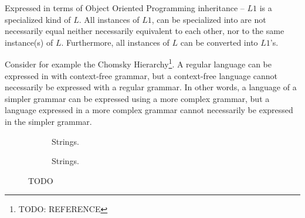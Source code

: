 \documentclass{scrreprt}
\begin{document}
Expressed in terms of Object Oriented Programming inheritance -- $L1$ is a specialized kind of $L$. All instances of $L1$, can be specialized into are not necessarily equal  neither necessarily equivalent to each other, nor to the same instance(s) of $L$. Furthermore, all instances of $L$ can be converted into $L1$'s.

Consider for example the Chomsky Hierarchy\footnote{TODO: REFERENCE}. A regular language can be expressed in with context-free grammar, but a context-free language cannot necessarily be expressed with a regular grammar. In other words, a language of a simpler grammar can be expressed using a more complex grammar, but a language expressed in a more complex grammar cannot necessarily be expressed in the simpler grammar.


\begin{figure}[h]
\centering

  \begin{subfigure}{.5\textwidth}
    \centering


    \caption{Strings.}
    \label{fig:concrete-specialization-tree-example-run}

  \end{subfigure}%
  \begin{subfigure}{.5\textwidth}

    \centering


    \caption{Strings.}
    \label{fig:concrete-specialization-tree-example-run}
  \end{subfigure}


  \caption{TODO}
  \label{fig:concrete-specialization-tree-example}
\end{figure}
\end{document}
